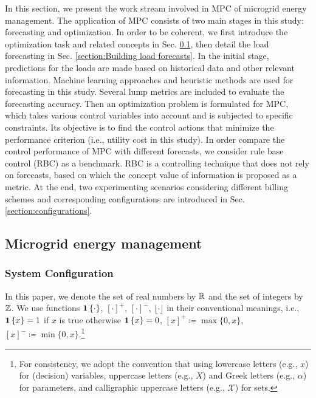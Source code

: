


In this section, we present the work stream involved in MPC of microgrid energy management. The application of MPC consists of two main stages in this study: forecasting and optimization. In order to be coherent, we first introduce the optimization task and related concepts in Sec. \ref{section:MEM}, then detail the load forecasting in Sec. \ref{section:Building load forecasts}. 
In the initial stage, predictions for the loads are made based on historical data and other relevant information. Machine learning approaches and heuristic methods are used for forecasting in this study. Several lump metrics are included to evaluate the forecasting accuracy.
Then an optimization problem is formulated for MPC, which takes various control variables into account and is subjected to specific constraints. Its objective is to find the control actions that minimize the performance criterion (i.e., utility cost in this study). In order compare the control performance of MPC with different forecasts, we consider rule base control (RBC) as a benchmark. RBC is a controlling technique that does not rely on forecasts, based on which the concept value of information is proposed as a metric. 
At the end, two experimenting scenarios considering different billing schemes and corresponding configurations are introduced in Sec. \ref{section:configurations}.

\subsection{Microgrid energy management} %
\label{section:MEM}
\subsubsection{System Configuration}

In this paper, we denote the set of real numbers by $\mathbb{R}$ and the set of integers by $\mathbb{Z}$. We use functions $\mathbf{1}\left\{\cdot\right\}$, $[\cdot]^{+}$, $[\cdot]^{-}$, $\lfloor \cdot \rfloor$ in their conventional meanings, i.e., $\mathbf{1}\left\{x\right\}=1$ if $x$ is true otherwise $\mathbf{1}\left\{x\right\}=0$, $[x]^{+} \coloneqq \max\{0,x\}$, $[x]^{-} \coloneqq \min\{0,x\}$.\footnote{
For consistency, we adopt the convention that using lowercase letters (e.g., $x$) for (decision) variables, uppercase letters (e.g., $X$) and Greek letters (e.g., $\alpha$) for parameters, and calligraphic uppercase letters (e.g., $\mathcal{X}$) for sets.}
    
